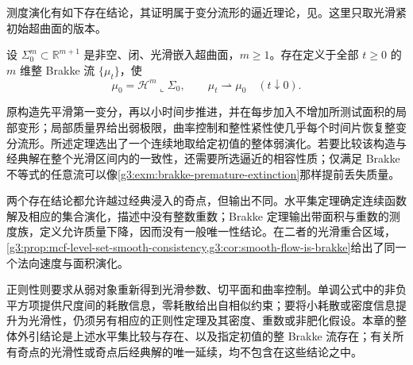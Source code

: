 测度演化有如下存在结论，其证明属于变分流形的逼近理论，见\cite[第4.26节，第106--108页；第4.29节，第116--120页]{Brakke1978Motion}。这里只取光滑紧初始超曲面的版本。

\begin{theorem}\label{g3:thm:brakke-existence-external}
	设 \(\Sigma_0^m\subset\mathbb R^{m+1}\) 是非空、闭、光滑嵌入超曲面，\(m\ge1\)。存在定义于全部 \(t\ge0\) 的 \(m\) 维整 Brakke 流 \(\{\mu_t\}\)，使
	\[
	\mu_0=\mathcal H^m\llcorner\Sigma_0,
	\qquad \mu_t\rightharpoonup\mu_0\quad(t\downarrow0).
	\]
\end{theorem}

原构造先平滑第一变分，再以小时间步推进，并在每步加入不增加所测试面积的局部变形；局部质量界给出弱极限，曲率控制和整性紧性使几乎每个时间片恢复整变分流形。所述定理选出了一个连续地取给定初值的整体弱演化。若要比较该构造与经典解在整个光滑区间内的一致性，还需要所选逼近的相容性质；仅满足 Brakke 不等式的任意流可以像\cref{g3:exm:brakke-premature-extinction}那样提前丢失质量。

\ProseParagraphBreak
两个存在结论都允许越过经典浸入的奇点，但输出不同。水平集定理确定连续函数解及相应的集合演化，描述中没有整数重数；Brakke 定理输出带面积与重数的测度族，定义允许质量下降，因而没有一般唯一性结论。在二者的光滑重合区域，\cref{g3:prop:mcf-level-set-smooth-consistency,g3:cor:smooth-flow-is-brakke}给出了同一个法向速度与面积演化。

\ProseParagraphBreak
正则性则要求从弱对象重新得到光滑参数、切平面和曲率控制。单调公式中的非负平方项提供尺度间的耗散信息，零耗散给出自相似约束；要将小耗散或密度信息提升为光滑性，仍须另有相应的正则性定理及其密度、重数或非肥化假设。本章的整体外引结论是上述水平集比较与存在、以及指定初值的整 Brakke 流存在；有关所有奇点的光滑性或奇点后经典解的唯一延续，均不包含在这些结论之中。
